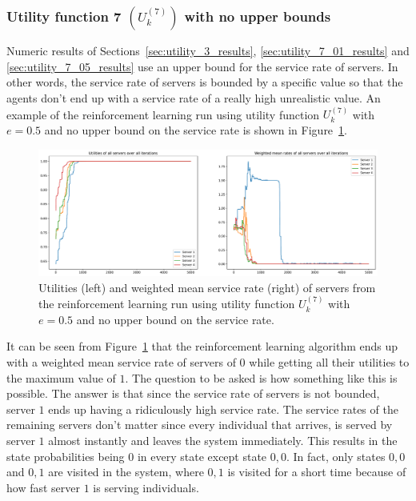 \subsubsection{Utility function 7 \((U_k^{(7)})\) with no upper bounds}
\label{sec:utility_7_no_upper_bound_results}

Numeric results of Sections~\ref{sec:utility_3_results},
\ref{sec:utility_7_01_results} and \ref{sec:utility_7_05_results} use an upper
bound for the service rate of servers.
In other words, the service rate of servers is bounded by a specific value
so that the agents don't end up with a service rate of a really high
unrealistic value.
An example of the reinforcement learning run using utility function
\(U_k^{(7)}\) with \(e = 0.5\) and no upper bound on the service rate is
shown in Figure~\ref{fig:RL_utility7_5_no_max_e05}.

\begin{figure}[H]
    \includegraphics[width=\textwidth]{chapters/06_agent_based_extension/Bin/reinforcement_learning_results/utility_7/u7_5_no_max_e05.pdf}
    \caption{Utilities (left) and weighted mean service rate (right) of servers
    from the reinforcement learning run using utility function \(U_k^{(7)}\)
    with \(e = 0.5\) and no upper bound on the service rate.}
    \label{fig:RL_utility7_5_no_max_e05}
\end{figure}

It can be seen from Figure~\ref{fig:RL_utility7_5_no_max_e05} that the
reinforcement learning algorithm ends up with a weighted mean service rate of
servers of \(0\) while getting all their utilities to the maximum value of
\(1\).
The question to be asked is how something like this is possible.
The answer is that since the service rate of servers is not bounded, server
\(1\) ends up having a ridiculously high service rate.
The service rates of the remaining servers don't matter since every individual
that arrives, is served by server \(1\) almost instantly and leaves the system
immediately.
This results in the state probabilities being \(0\) in every state except state
\(0,0\).
In fact, only states \(0,0\) and \(0,1\) are visited in the system, where
\(0,1\) is visited for a short time because of how fast server \(1\) is
serving individuals.


